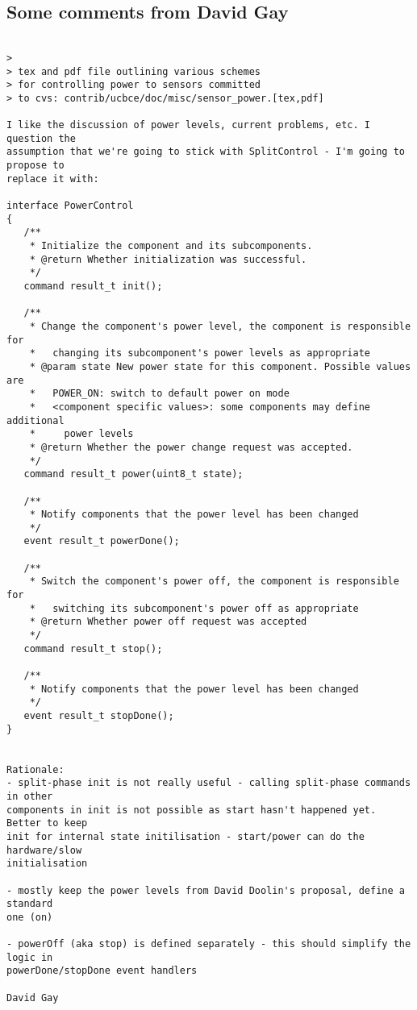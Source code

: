 \documentclass[10pt]{article}
\begin{document}
\subsection*{Some comments from David Gay}

\begin{verbatim}

> 
> tex and pdf file outlining various schemes
> for controlling power to sensors committed
> to cvs: contrib/ucbce/doc/misc/sensor_power.[tex,pdf]

I like the discussion of power levels, current problems, etc. I question the 
assumption that we're going to stick with SplitControl - I'm going to propose to 
replace it with:

interface PowerControl
{
   /**
    * Initialize the component and its subcomponents.
    * @return Whether initialization was successful.
    */
   command result_t init();

   /**
    * Change the component's power level, the component is responsible for
    *   changing its subcomponent's power levels as appropriate
    * @param state New power state for this component. Possible values are
    *   POWER_ON: switch to default power on mode
    *   <component specific values>: some components may define additional
    *     power levels
    * @return Whether the power change request was accepted.
    */
   command result_t power(uint8_t state);

   /**
    * Notify components that the power level has been changed
    */
   event result_t powerDone();

   /**
    * Switch the component's power off, the component is responsible for
    *   switching its subcomponent's power off as appropriate
    * @return Whether power off request was accepted
    */
   command result_t stop();

   /**
    * Notify components that the power level has been changed
    */
   event result_t stopDone();
}


Rationale:
- split-phase init is not really useful - calling split-phase commands in other 
components in init is not possible as start hasn't happened yet. Better to keep 
init for internal state initilisation - start/power can do the hardware/slow 
initialisation

- mostly keep the power levels from David Doolin's proposal, define a standard 
one (on)

- powerOff (aka stop) is defined separately - this should simplify the logic in 
powerDone/stopDone event handlers

David Gay
\end{verbatim}
\end{document}
